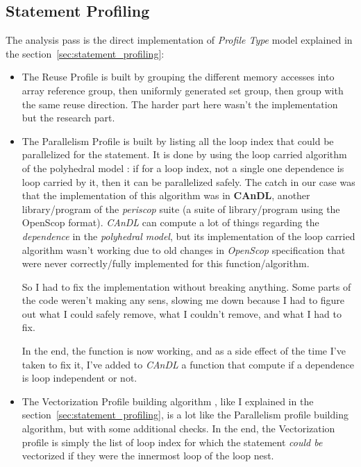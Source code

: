 \documentclass[paper=a4, fontsize=11.5pt]{scrartcl}
\numberwithin{equation}{section}        %
\numberwithin{figure}{section}          %
\numberwithin{table}{section}               %
\begin{document}
    \subsection{Statement Profiling}
    The analysis pass is the direct implementation of \textit{Profile Type} model explained in the section~\ref{sec:statement_profiling}:
    \begin{itemize}
        \item The Reuse Profile is built by grouping the
            different memory accesses into array reference group, then uniformly generated set group,
            then group with the same reuse direction. The harder part here wasn't the
            implementation but the research part.

        \item The Parallelism Profile is built by listing all the loop index that could be
            parallelized for the statement. It is done by using the loop carried algorithm
            of the polyhedral model : if for a loop index, not a single one dependence is
            loop carried by it, then it can be parallelized safely.
            The catch in our case was that the implementation of this algorithm was in
            \textbf{CAnDL}, another library/program of the \textit{periscop} suite (a suite of
            library/program using the OpenScop format). \textit{CAnDL} can compute
            a lot of things regarding the \textit{dependence} in the \textit{polyhedral model},
            but its implementation of the loop carried algorithm wasn't working due to old
            changes in \textit{OpenScop} specification that were never correctly/fully implemented
            for this function/algorithm.
            
            So I had to fix the implementation without breaking anything.
            Some parts of the code weren't making any sens, slowing me down because I had
            to figure out what I could safely remove, what I couldn't remove, and what I
            had to fix.

            In the end, the function is now working, and as a side effect of the time I've taken
            to fix it, I've added to \textit{CAnDL} a function that compute if a dependence
            is loop independent or not.
        \item The Vectorization Profile building algorithm
            , like I explained in the section~\ref{sec:statement_profiling}, is a lot like
            the Parallelism profile building algorithm, but with some additional checks.
            In the end, the Vectorization profile is simply the list of loop index for which
            the statement \textit{could be} vectorized if they were the innermost loop of the loop nest.\\


\end{itemize}
\end{document}
